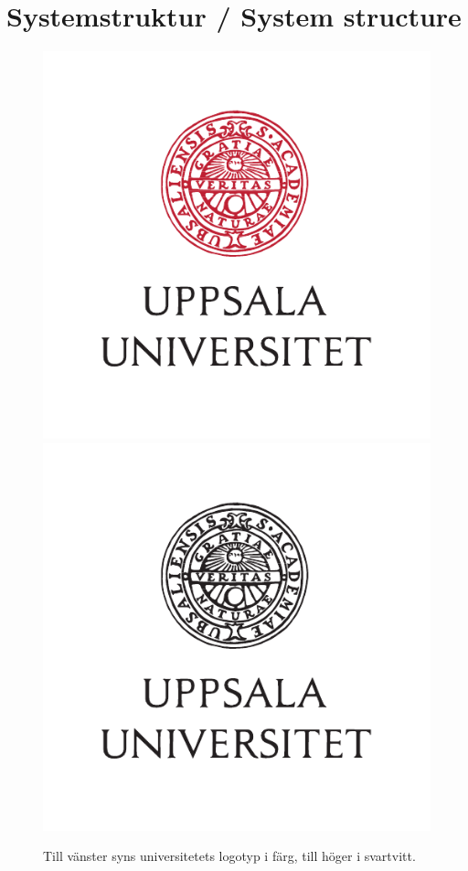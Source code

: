 \documentclass[a4paper,12pt]{article}
\begin{document}
\section{Systemstruktur / System structure}
\begin{figure}
\begin{center}
  \includegraphics[height=5\baselineskip]{logo_name.pdf}
\hspace{2cm}
  \includegraphics[height=5\baselineskip]{logo_name_sv.pdf}
\end{center}
\caption{Till vänster syns universitetets logotyp i färg, till höger i svartvitt.}
  \label{fig:exempel}
\end{figure}
\end{document}
